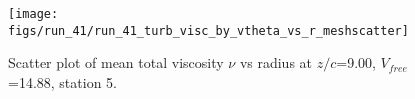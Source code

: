 \begin{figure}[H]
\centering
\texttt{[image: figs/run\_41/run\_41\_turb\_visc\_by\_vtheta\_vs\_r\_meshscatter]}
\caption{Scatter plot of mean total viscosity $\nu$ vs radius at $z/c$=9.00, $V_{free}$=14.88, station 5.}
\label{fig:run_41_turb_visc_by_vtheta_vs_r_meshscatter}
\end{figure}



